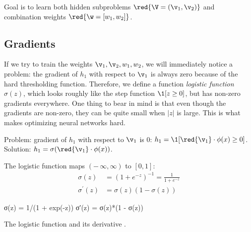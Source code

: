 \begin{example}
Goal is to learn both hidden subproblems $\red{\V = (\v_1, \v_2)}$ and combination weights $\red{\w = [w_1, w_2]}$.
\end{example}



\subsection{Gradients}
If we try to train the weights $\v_1,\v_2,w_1,w_2$, we will immediately notice a problem:
%
the gradient of $h_1$ with respect to $\v_1$ is always zero because of the hard thresholding function.
%
Therefore, we define a function \textit{logistic function} $\sigma(z)$, which looks roughly like the step function $\1[z \ge 0]$,
%
but has non-zero gradients everywhere.
%
One thing to bear in mind is that even though the gradients are non-zero, they can be quite small when $|z|$ is large.
%
This is what makes optimizing neural networks hard.

Problem: gradient of $h_1$ with respect to $\v_1$ is $0$:
$h_1 = \1[\red{\v_1} \cdot \phi(x) \ge 0]$. 
Solution:
$h_1 = \sigma(\red{\v_1} \cdot \phi(x))$.

\begin{example}
The logistic function maps $(-\,\infty, \infty)$ to $[0, 1]$:
\begin{align*}
	\sigma(z) &= (1 + e^{-z})^{-1} = \frac{1}{1 + e^{-z}}\\
	\sigma^\prime(z) &= \sigma(z) (1 - \sigma(z)) \tag{derivative}
\end{align*}
\end{example}
\begin{algorithm}
\begin{juliaverbatim}
σ(z) = 1/(1 + exp(-z))
σ′(z) = σ(z)*(1 - σ(z))
\end{juliaverbatim}
\caption{\label{alg:sigmoid} The logistic function  and its derivative .}
\end{algorithm}


